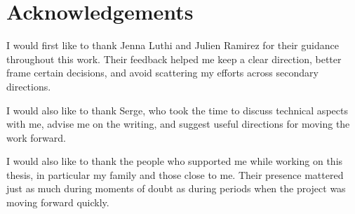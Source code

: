 \section*{Acknowledgements}

I would first like to thank Jenna Luthi and Julien Ramirez for their guidance throughout this work. Their feedback helped me keep a clear direction, better frame certain decisions, and avoid scattering my efforts across secondary directions.

I would also like to thank Serge, who took the time to discuss technical aspects with me, advise me on the writing, and suggest useful directions for moving the work forward.

I would also like to thank the people who supported me while working on this thesis, in particular my family and those close to me. Their presence mattered just as much during moments of doubt as during periods when the project was moving forward quickly.
